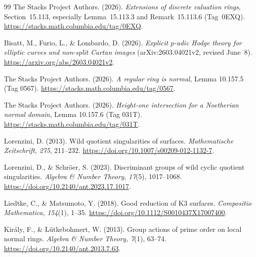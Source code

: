 \begin{thebibliography}{99}
The Stacks Project Authors. (2026).
\emph{Extensions of discrete valuation rings}, Section~15.113,
especially Lemma~15.113.3 and Remark~15.113.6 (Tag~0EXQ).
\url{https://stacks.math.columbia.edu/tag/0EXQ}.

Bisatt, M., Furio, L., \& Lombardo, D. (2026). \emph{Explicit $p$-adic Hodge theory for elliptic curves and non-split Cartan images} (arXiv:2603.04021v2, revised June~8). \url{https://arxiv.org/abs/2603.04021v2}.

The Stacks Project Authors. (2026).
\emph{A regular ring is normal}, Lemma 10.157.5 (Tag 0567).
\url{https://stacks.math.columbia.edu/tag/0567}.

The Stacks Project Authors. (2026).
\emph{Height-one intersection for a Noetherian normal domain},
Lemma 10.157.6 (Tag 031T).
\url{https://stacks.math.columbia.edu/tag/031T}.

Lorenzini, D. (2013). Wild quotient singularities of surfaces.
\emph{Mathematische Zeitschrift, 275}, 211--232.
\url{https://doi.org/10.1007/s00209-012-1132-7}.

Lorenzini, D., \& Schr\"oer, S. (2023).
Discriminant groups of wild cyclic quotient singularities.
\emph{Algebra \& Number Theory, 17}(5), 1017--1068.
\url{https://doi.org/10.2140/ant.2023.17.1017}.

Liedtke, C., \& Matsumoto, Y. (2018). Good reduction of K3 surfaces.
\emph{Compositio Mathematica, 154}(1), 1--35.
\url{https://doi.org/10.1112/S0010437X17007400}.

Kir\'aly, F., \& L\"utkebohmert, W. (2013).
Group actions of prime order on local normal rings.
\emph{Algebra \& Number Theory, 7}(1), 63--74.
\url{https://doi.org/10.2140/ant.2013.7.63}.

\end{thebibliography}
